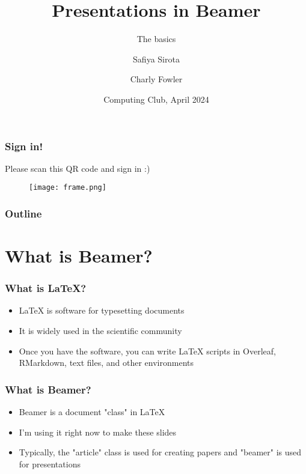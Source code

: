 \documentclass{beamer}
\title[Beamer Intro] %
{Presentations in Beamer}
\subtitle{The basics}
\author[Computing Club] %
{Safiya Sirota\inst{1} \and Charly Fowler\inst{2}}
\institute[CUIMC] %
{
  \inst{1}
  Third year biostats PhD student\\
  Columbia University

  \inst{2}
  Fifth year biostats PhD student\\
  Columbia University
  
}
\date[Spring 2024] %
{Computing Club, April 2024}
\begin{document}
\begin{frame}
\frametitle{Sign in!}

Please scan this QR code and sign in :)

\begin{figure}[H]
    \centering
    \texttt{[image: frame.png]}
\end{figure}

\end{frame}

\frame{\titlepage}


\begin{frame}
\frametitle{Outline}
\tableofcontents
\end{frame}


\section{What is Beamer?}

\begin{frame}
\frametitle{What is \LaTeX?}

\begin{itemize}
    \item<1-> \LaTeX \hspace{0.05cm} is software for typesetting documents
    \item<2-> It is widely used in the scientific community
    \item<3> Once you have the software, you can write \LaTeX \hspace{0.05cm} scripts in Overleaf, RMarkdown, text files, and other environments
\end{itemize}
\end{frame}




\begin{frame}
\frametitle{What is Beamer?}

\begin{itemize}
    \item<1-> Beamer is a document "class" in \LaTeX
    \item<2-> I'm using it right now to make these slides
    \item<3-> Typically, the "article" class is used for creating papers and "beamer" is used for presentations
\end{itemize}
\end{frame}
\end{document}
